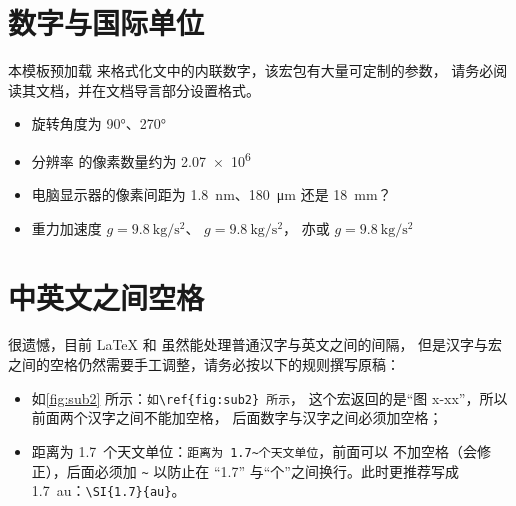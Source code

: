 \section{数字与国际单位}

本模板预加载  来格式化文中的内联数字，该宏包有大量可定制的参数，
请务必阅读其文档，并在文档导言部分设置格式。

\begin{itemize}
  \item 旋转角度为 \ang{90}、\ang{270}
  \item 分辨率  的像素数量约为 \num{2.07e6}
  \item 电脑显示器的像素间距为 \SI{1.8}{\nm}、\SI{180}{\um} 还是 \SI{18}{\mm}？
  \item 重力加速度 $g=\SI{9.8}{\kg\per\square\second}$、
  $g=\SI[inter-unit-product=\ensuremath{{}\cdot{}}]{9.8}{\kg\per\square\second}$，
  亦或 $g=\SI[per-mode=symbol]{9.8}{\kg\per\square\second}$
\end{itemize}

\section{中英文之间空格}

很遗憾，目前 \LaTeX{} 和 \CTeX{} 虽然能处理普通汉字与英文之间的间隔，
但是汉字与宏之间的空格仍然需要手工调整，请务必按以下的规则撰写原稿：
\begin{itemize}
  \item 如\ref{fig:sub2} 所示：\verb|如\ref{fig:sub2} 所示|，
      这个宏返回的是\enquote{图 x-xx}，所以前面两个汉字之间不能加空格，
      后面数字与汉字之间必须加空格；
  \item 距离为 1.7~个天文单位：\verb|距离为 1.7~个天文单位|，前面可以
      不加空格（\CTeX 会修正），后面必须加 \verb|~| 以防止在 \enquote{1.7}
      与\enquote{个}之间换行。此时更推荐写成 \SI{1.7}{au}：\verb|\SI{1.7}{au}|。
\end{itemize}

